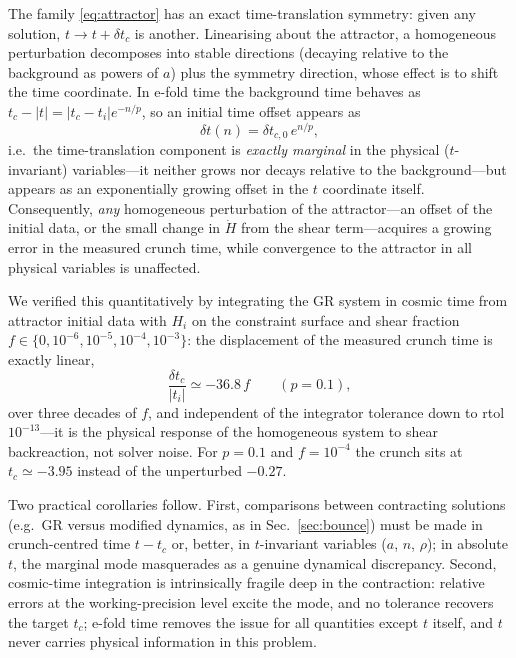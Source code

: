 \documentclass[11pt,a4paper]{article}
\begin{document}
The family \eqref{eq:attractor} has an exact time-translation symmetry:
given any solution, $t\to t+\delta t_c$ is another. Linearising about the
attractor, a homogeneous perturbation decomposes into stable directions
(decaying relative to the background as powers of $a$) plus the symmetry
direction, whose effect is to shift the time coordinate. In e-fold time the
background time behaves as $t_c-|t|=|t_c-t_i|e^{-n/p}$, so an initial
time offset appears as
\begin{equation}
  \delta t(n)=\delta t_{c,0}\,e^{n/p},
  \label{eq:marginal}
\end{equation}
i.e.\ the time-translation component is \emph{exactly marginal} in the
physical ($t$-invariant) variables---it neither grows nor decays relative
to the background---but appears as an exponentially growing offset in the
$t$ coordinate itself. Consequently, \emph{any} homogeneous perturbation of
the attractor---an offset of the initial data, or the small change in
$\dot H$ from the shear term---acquires a growing error in the measured
crunch time, while convergence to the attractor in all physical variables
is unaffected.

We verified this quantitatively by integrating the GR system in cosmic time
from attractor initial data with $H_i$ on the constraint surface and shear
fraction $f\in\{0,10^{-6},10^{-5},10^{-4},10^{-3}\}$: the displacement of
the measured crunch time is exactly linear,
\begin{equation}
  \frac{\delta t_c}{|t_i|}\simeq -36.8\,f \qquad (p=0.1),
  \label{eq:drift}
\end{equation}
over three decades of $f$, and independent of the integrator tolerance down
to rtol $10^{-13}$---it is the physical response of the homogeneous system
to shear backreaction, not solver noise. For $p=0.1$ and $f=10^{-4}$ the
crunch sits at $t_c\simeq-3.95$ instead of the unperturbed $-0.27$.

Two practical corollaries follow. First, comparisons between contracting
solutions (e.g.\ GR versus modified dynamics, as in
Sec.~\ref{sec:bounce}) must be made in crunch-centred time $t-t_c$ or,
better, in $t$-invariant variables ($a$, $n$, $\rho$); in absolute $t$, the
marginal mode masquerades as a genuine dynamical discrepancy. Second,
cosmic-time integration is intrinsically fragile deep in the contraction:
relative errors at the working-precision level excite the mode, and no
tolerance recovers the target $t_c$; e-fold time removes the issue for all
quantities except $t$ itself, and $t$ never carries physical information in
this problem.
\end{document}
